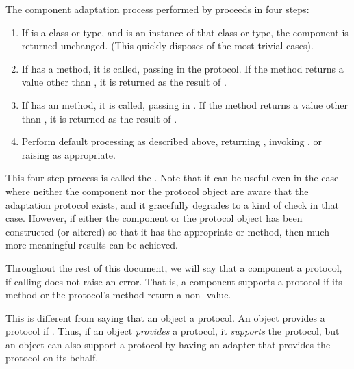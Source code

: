 The component adaptation process performed by  proceeds
in four steps:

\begin{enumerate}

\item If  is a class or type, and  is an instance
of that class or type, the component is returned unchanged.  (This quickly
disposes of the most trivial cases).

\item If  has a  method, it is called,
passing in the protocol.  If the method returns a value other than
, it is returned as the result of .

\item If  has an  method, it is called,
passing in .  If the method returns a value other than
, it is returned as the result of .

\item Perform default processing as described above, returning ,
invoking , or raising  as
appropriate.

\end{enumerate}

This four-step process is called the .  Note
that it can be useful even in the case where neither the component nor the
protocol object are aware that the adaptation protocol exists, and it
gracefully degrades to a kind of  check in that
case.  However, if either the component or the protocol object has been
constructed (or altered) so that it has the appropriate 
or  method, then much more meaningful results can be
achieved.

Throughout the rest of this document, we will say that a component
 a protocol, if calling  does
not raise an error.  That is, a component supports a protocol if its
 method or the protocol's  method
return a non- value.

This is different from saying that an object  a protocol.  An
object provides a protocol if .  Thus,
if an object \emph{provides} a protocol, it \emph{supports} the protocol, but
an object can also support a protocol by having an adapter that provides the
protocol on its behalf.

